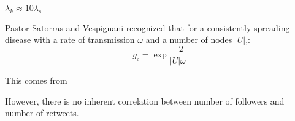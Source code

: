$\lambda_k \approx 10\lambda_s$


Pastor-Satorras and Vespignani recognized that for a consistently spreading disease with a rate of transmission $\omega$ and a number of nodes $|U|$,:
  \begin{equation}
    g_c = \exp{\frac{-2}{|U|\omega}}
\end{equation}

This comes from 

However, there is no inherent correlation between number of followers and number of retweets. 






